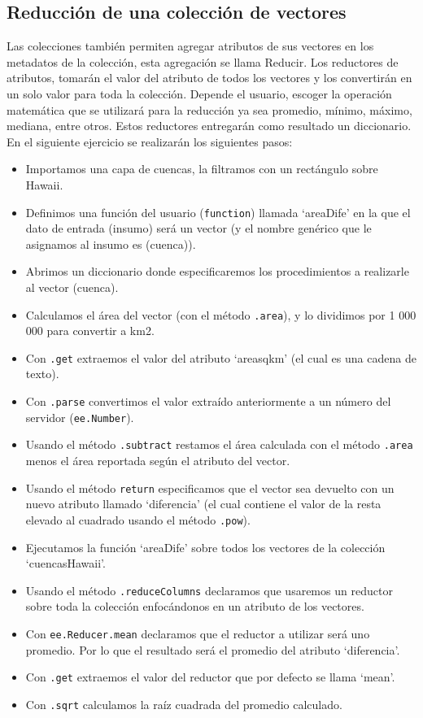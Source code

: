 \documentclass[
  12pt,
  letterpaper,
  twoside]{book}
\providecommand{\tightlist}{%
  \setlength{\itemsep}{0pt}\setlength{\parskip}{0pt}}
\begin{document}
\hypertarget{reducciuxf3n-de-una-colecciuxf3n-de-vectores}{%
\subsection*{Reducción de una colección de vectores}\label{reducciuxf3n-de-una-colecciuxf3n-de-vectores}}

Las colecciones también permiten agregar atributos de sus vectores en los metadatos de la colección, esta agregación se llama Reducir. Los reductores de atributos, tomarán el valor del atributo de todos los vectores y los convertirán en un solo valor para toda la colección. Depende el usuario, escoger la operación matemática que se utilizará para la reducción ya sea promedio, mínimo, máximo, mediana, entre otros. Estos reductores entregarán como resultado un diccionario. En el siguiente ejercicio se realizarán los siguientes pasos:

\begin{itemize}
\tightlist
\item
  Importamos una capa de cuencas, la filtramos con un rectángulo sobre Hawaii.
\item
  Definimos una función del usuario (\texttt{function}) llamada `areaDife' en la que el dato de entrada (insumo) será un vector (y el nombre genérico que le asignamos al insumo es (cuenca)).
\item
  Abrimos un diccionario donde especificaremos los procedimientos a realizarle al vector (cuenca).
\item
  Calculamos el área del vector (con el método \texttt{.area}), y lo dividimos por 1 000 000 para convertir a km2.
\item
  Con \texttt{.get} extraemos el valor del atributo `areasqkm' (el cual es una cadena de texto).
\item
  Con \texttt{.parse} convertimos el valor extraído anteriormente a un número del servidor (\texttt{ee.Number}).
\item
  Usando el método \texttt{.subtract} restamos el área calculada con el método \texttt{.area} menos el área reportada según el atributo del vector.
\item
  Usando el método \texttt{return} especificamos que el vector sea devuelto con un nuevo atributo llamado `diferencia' (el cual contiene el valor de la resta elevado al cuadrado usando el método \texttt{.pow}).
\item
  Ejecutamos la función `areaDife' sobre todos los vectores de la colección `cuencasHawaii'.
\item
  Usando el método \texttt{.reduceColumns} declaramos que usaremos un reductor sobre toda la colección enfocándonos en un atributo de los vectores.
\item
  Con \texttt{ee.Reducer.mean} declaramos que el reductor a utilizar será uno promedio. Por lo que el resultado será el promedio del atributo `diferencia'.
\item
  Con \texttt{.get} extraemos el valor del reductor que por defecto se llama `mean'.
\item
  Con \texttt{.sqrt} calculamos la raíz cuadrada del promedio calculado.
\end{itemize}
\end{document}
